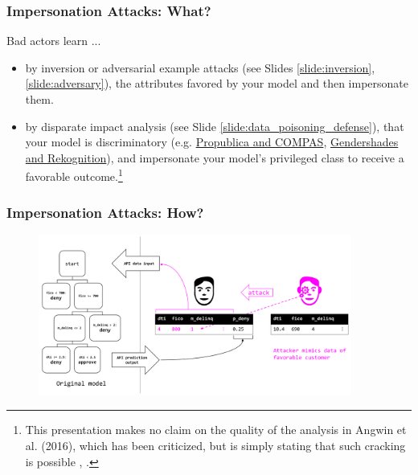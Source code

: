 \documentclass[11pt,
               aspectratio=169,
               hyperref={colorlinks}
               ]{beamer}
\begin{document}
			\begin{frame}
		
				\frametitle{Impersonation Attacks: \textbf{What?}}		
Bad actors learn ... 
				\begin{itemize}
					\item by inversion or adversarial example attacks (see Slides \ref{slide:inversion}, \ref{slide:adversary}), the attributes favored by your model and then impersonate them.
					\item by disparate impact analysis (see Slide \ref{slide:data_poisoning_defense}), that your model is discriminatory (e.g. \href{https://www.propublica.org/article/machine-bias-risk-assessments-in-criminal-sentencing}{Propublica and COMPAS}, \href{https://medium.com/@Joy.Buolamwini/response-racial-and-gender-bias-in-amazon-rekognition-commercial-ai-system-for-analyzing-faces-a289222eeced}{Gendershades and Rekognition}), and impersonate your model's privileged class to receive a favorable outcome.\footnote{This presentation makes no claim on the quality of the analysis in Angwin et al. (2016), which has been criticized, but is simply stating that such cracking is possible \cite{angwin16,}, \cite{flores2016false}.}
				\end{itemize}
				
			\end{frame}

			\begin{frame}
		
				\frametitle{Impersonation Attacks: \textbf{How?}}		
			
				\begin{figure}[htb]
					\begin{center}
						\includegraphics[height=150pt]{img/imperson.PNG}
					\end{center}
				\end{figure}	
				
			\end{frame}
			
\end{document}
